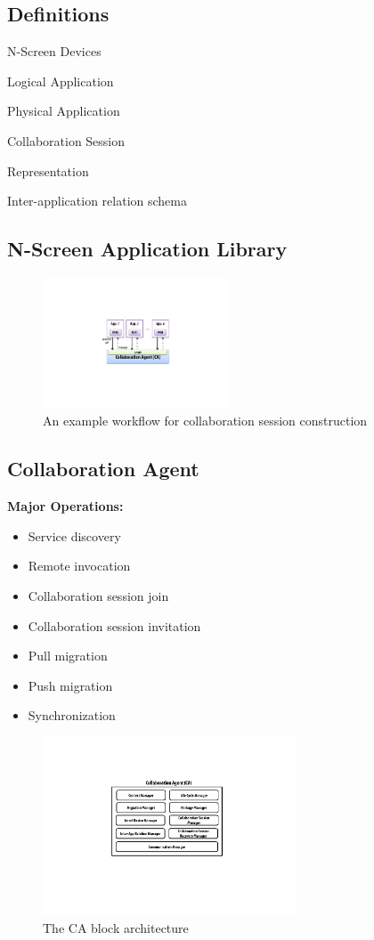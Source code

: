 \documentclass{sig-alternate}
\newcommand{\bi}{\begin{itemize}}
\newcommand{\ei}{\end{itemize}}
\newcommand{\ii}{\item}
\begin{document}
\subsection{Definitions}
N-Screen Devices

Logical Application

Physical Application

Collaboration Session

  Representation

    Inter-application relation schema

\subsection{N-Screen Application Library}
    \begin{figure}[htb] %
    \centering
    \includegraphics[width=5.5cm,keepaspectratio]{ca-api}
    \caption{An example workflow for collaboration session construction}
    \label{fig:ca-api}
    \end{figure}

\subsection{Collaboration Agent}

\noindent
\textbf{Major Operations:} 
\bi
\ii Service discovery
\ii Remote invocation
\ii Collaboration session join
\ii Collaboration session invitation
\ii Pull migration
\ii Push migration
\ii Synchronization
\ei

    \begin{figure}[htb] %
    \centering
    \includegraphics[width=7.5cm,keepaspectratio]{collaborationagent}
    \caption{The CA block architecture}
    \label{fig:collaborationagent}
    \end{figure}
\end{document}
